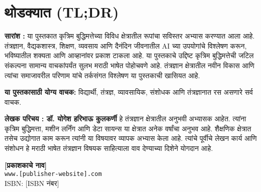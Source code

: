 \chapter*{थोडक्यात  (TL;DR)}

\thispagestyle{empty}
\null\vfill


\noindent\textbf{सारांश :} या पुस्तकात कृत्रिम बुद्धिमत्तेच्या विविध क्षेत्रातील रूपांचा सविस्तर अभ्यास करण्यात आला आहे. तंत्रज्ञान, वैद्यकशास्त्र, शिक्षण, व्यवसाय आणि दैनंदिन जीवनातील AI च्या उपयोगांचे विश्लेषण करून, भविष्यातील शक्यता आणि आव्हानांवर प्रकाश टाकला आहे. या पुस्तकाचे उद्दिष्ट कृत्रिम बुद्धिमत्तेची जटिल संकल्पना सामान्य वाचकांपर्यंत सुलभ मराठी भाषेत पोहोचवणे आहे. तंत्रज्ञान क्षेत्रातील नवीन विकास आणि त्यांचा समाजावरील परिणाम यांचे तर्कसंगत विश्लेषण या पुस्तकाची खासियत आहे.

\vspace{1.5em}

\noindent\textbf{या पुस्तकासाठी योग्य वाचक:} विद्यार्थी, तंत्रज्ञ, व्यावसायिक, संशोधक आणि तंत्रज्ञानात रस असणारे सर्व वाचक.

\vspace{1.5em}

\noindent\textbf{लेखक परिचय :  डॉ. योगेश हरिभाऊ कुलकर्णी} हे तंत्रज्ञान क्षेत्रातील अनुभवी अभ्यासक आहेत. त्यांना कृत्रिम बुद्धिमत्ता, मशीन लर्निंग आणि डेटा सायन्स या क्षेत्रात अनेक वर्षांचा अनुभव आहे. शैक्षणिक क्षेत्रात तसेच उद्योगात काम करून त्यांनी या विषयावर व्यापक अभ्यास केला आहे.  त्यांचे पूर्वीचे लेखन कार्य आणि संशोधन हे मराठी भाषेत तंत्रज्ञान विषयक साहित्याला वाव देण्याच्या दिशेने योगदान आहे.

\vspace{1em}

\begin{center}
\end{center}

\vfill

\begin{center}
\textbf{[प्रकाशकाचे नाव]}\\
\texttt{www.[publisher-website].com}\\
ISBN: [ISBN नंबर]
\end{center}




